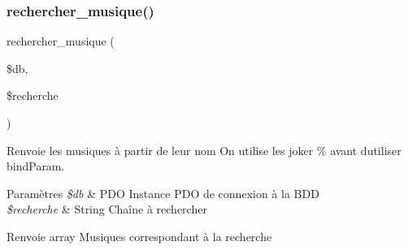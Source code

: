 \subsubsection{\texorpdfstring{rechercher\+\_\+musique()}{rechercher\_musique()}}
{\footnotesize\ttfamily rechercher\+\_\+musique (\begin{DoxyParamCaption}\item[{}]{\$db,  }\item[{}]{\$recherche }\end{DoxyParamCaption})}



Renvoie les musiques à partir de leur nom On utilise les joker \% avant d\textquotesingle{}utiliser bind\+Param. 


\begin{DoxyParams}{Paramètres}
{\em \$db} & P\+DO Instance P\+DO de connexion à la B\+DD \\
\hline
{\em \$recherche} & String Chaîne à rechercher \\
\hline
\end{DoxyParams}
\begin{DoxyReturn}{Renvoie}
array Musiques correspondant à la recherche 
\end{DoxyReturn}
